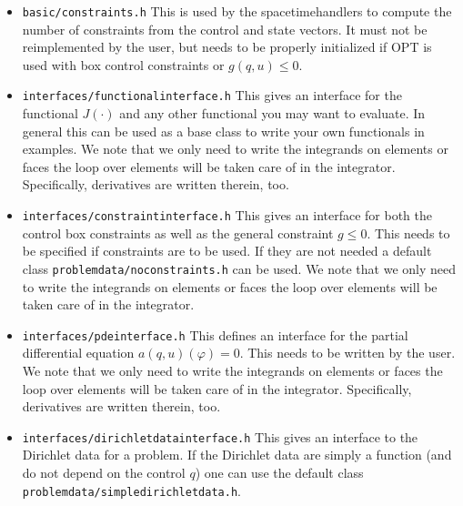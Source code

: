 \documentclass[prodmode,acmtoms]{acmsmall}
\numberwithin{equation}{section}
\renewcommand{\phi}{\varphi}
\begin{document}
\begin{itemize}
  \item \texttt{basic/constraints.h} This is used by the spacetimehandlers to 
    compute the number of constraints from the control and state vectors. 
    It must not be reimplemented by the user, but needs to be properly 
    initialized if OPT is used with box control constraints or $g(q,u) \le 0$.
  \item \texttt{interfaces/functionalinterface.h} This gives an interface 
    for the functional $J(\cdot)$ and any other functional you may want to evaluate.
    In general this can be used as a base class to write your own functionals 
    in examples. We note that we only need to write the integrands on 
    elements or faces the loop over elements will be taken care of in the integrator.
    Specifically, derivatives are written therein, too.
  \item \texttt{interfaces/constraintinterface.h} This gives an interface for both 
    the control box constraints as well as the general constraint $g \le 0$. This 
    needs to be specified if constraints are to be used. If they are not needed 
    a default class \texttt{problemdata/noconstraints.h} can be used. We note that we only 
    need to write the integrands on 
    elements or faces the loop over elements will be taken care of in the integrator.
  \item \texttt{interfaces/pdeinterface.h} This defines an interface for the 
    partial differential equation $a(q,u)(\phi) = 0$. This needs to be written
    by the user. We note that we only need to write the integrands on 
    elements or faces the loop over elements will be taken care of in the integrator.
    Specifically, derivatives are written therein, too.
  \item \texttt{interfaces/dirichletdatainterface.h} This gives an interface to the 
    Dirichlet data for a problem. If the Dirichlet data are simply a function 
    (and do not depend on the control $q$) one can use the default class\\
    \texttt{problemdata/simpledirichletdata.h}.
\end{itemize}
\end{document}
